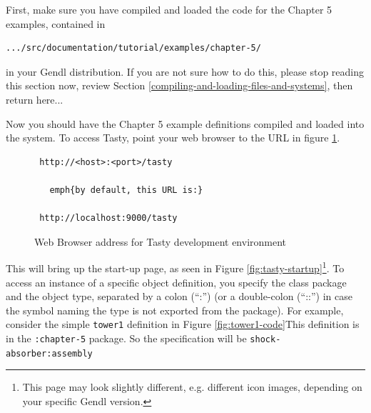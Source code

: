 \documentclass [11pt]{book}
\begin{document}
First, make sure you have compiled and loaded the code for
the Chapter 5 examples, contained in 

\begin{verbatim}.../src/documentation/tutorial/examples/chapter-5/
\end{verbatim} in your Gendl distribution. If you are not sure how to do this,
please stop reading this section now, review Section 
\ref{compiling-and-loading-files-and-systems}, then return here...



Now you should have the Chapter 5 example definitions
compiled and loaded into the system. To access Tasty, point your web
browser to the URL in figure
\ref{fig:tasty-toplevel-url}.
\begin{figure}
\begin{lrbox}{\boxedverb}
\begin{minipage}{\linewidth}

\begin{verbatim}
 http://<host>:<port>/tasty

   emph{by default, this URL is:}

 http://localhost:9000/tasty
\end{verbatim}
\end{minipage}
\end{lrbox}
\fbox{\usebox{\boxedverb}}

\caption{Web Browser address for Tasty development environment}

\label{fig:tasty-toplevel-url}

\end{figure}
This will bring up the start-up page, as seen in Figure 
\ref{fig:tasty-startup}\footnote{This page may look slightly different, e.g. different
icon images, depending on your specific Gendl version.}. To access an instance of a specific object definition,
you specify the class package and the object type, separated by a
colon (``:'') (or a double-colon (``::'') in case the symbol naming
the type is not exported from the package). For example, consider the
simple \texttt{tower1} definition in Figure 
\ref{fig:tower1-code}This definition is in the \texttt{:chapter-5} package. So the specification will be \texttt{shock-absorber:assembly}
\end{document}
